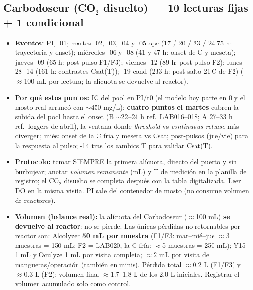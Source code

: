 \documentclass[10pt,landscape]{article}
\begin{document}
\subsection*{Carbodoseur (CO$_2$ disuelto) — 10 lecturas fijas + 1 condicional}
\begin{itemize}\setlength{\itemsep}{1pt}
\item \textbf{Eventos:} PI, -01; martes -02, -03, -04 y -05 opc (17 / 20 / 23 / 24.75 h: trayectoria y onset); miércoles -06 y -08 (41 y 47 h: onset de C y meseta); jueves -09 (65 h: post-pulso F1/F3); viernes -12 (89 h: post-pulso F2); lunes 28 -14 (161 h: contrastes Csat(T)); -19 cond (233 h: post-salto 21\,\textdegree C de F2) ($\approx$100 mL por lectura; la alícuota se devuelve al reactor).
\item \textbf{Por qué estos puntos:} IC del pool en PI/t0 (el modelo hoy parte en 0 y el mosto real arrancó con $\sim$450 mg/L); \textbf{cuatro puntos el martes} cubren la subida del pool hasta el onset (B $\sim$22--24 h ref.\ LAB016--018; A 27--33 h ref.\ loggers de abril), la ventana donde \emph{threshold} vs \emph{continuous release} más divergen; miés: onset de la C fría y meseta vs Csat; post-pulsos (jue/vie) para la respuesta al pulso; -14 tras los cambios T para validar Csat(T).
\item \textbf{Protocolo:} tomar SIEMPRE la primera alícuota, directo del puerto y sin burbujear; anotar \emph{volumen remanente} (mL) y T de medición en la planilla de registro; el CO$_2$ disuelto se completa después con la tabla digitalizada. Leer DO en la misma visita. PI sale del contenedor de mosto (no consume volumen de reactores).
\item \textbf{Volumen (balance real):} la alícuota del Carbodoseur ($\approx$100 mL) \textbf{se devuelve al reactor}: no se pierde. Las únicas pérdidas no retornables por reactor son: Alcolyzer \textbf{50 mL por muestra} (F1/F3: mar--mié--jue $\approx$3 muestras = 150 mL; F2 = LAB020, la C fría: $\approx$5 muestras = 250 mL); Y15 1 mL y Oculyze 1 mL por visita completa; $\approx$2 mL por visita de mangueras/operación (también en minis). Pérdida total $\approx$0.2 L (F1/F3) y $\approx$0.3 L (F2): volumen final $\approx$1.7--1.8 L de los 2.0 L iniciales. Registrar el volumen acumulado solo como control.
\end{itemize}
\end{document}
